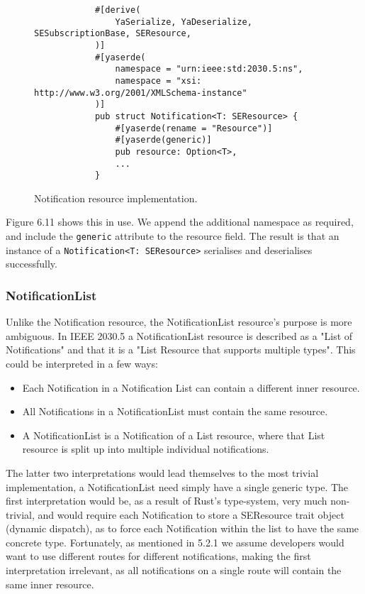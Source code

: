 \begin{figure}[H]
    \begin{center}
        \begin{lstlisting}
            #[derive(
                YaSerialize, YaDeserialize, SESubscriptionBase, SEResource,
            )]
            #[yaserde(
                namespace = "urn:ieee:std:2030.5:ns",
                namespace = "xsi: http://www.w3.org/2001/XMLSchema-instance"
            )]
            pub struct Notification<T: SEResource> {
                #[yaserde(rename = "Resource")]
                #[yaserde(generic)]
                pub resource: Option<T>,
                ...
            }    
        \end{lstlisting}
        \label{fig:notifimpl}
        \caption{Notification resource implementation.}
    \end{center}
\end{figure}

Figure 6.11 shows this in use. We append the additional namespace as required, and include the \texttt{generic} attribute to the resource field. The result is that an instance of a \texttt{Notification<T: SEResource>} serialises and deserialises successfully. 


\subsubsection{NotificationList}
Unlike the Notification resource, the NotificationList resource's purpose is more ambiguous. In IEEE 2030.5 a NotificationList resource is described as a "List of Notifications" and that it is a "List Resource that supports multiple types". This could be interpreted in a few ways:

\begin{itemize}
    \item Each Notification in a Notification List can contain a different inner resource.
    \item All Notifications in a NotificationList must contain the same resource.
    \item A NotificationList is a Notification of a List resource, where that List resource is split up into multiple individual notifications.
\end{itemize}

The latter two interpretations would lead themselves to the most trivial implementation, a NotificationList need simply have a single generic type. The first interpretation would be, as a result of Rust's type-system, very much non-trivial, and would require each Notification to store a SEResource trait object (dynamic dispatch), as to force each Notification within the list to have the same concrete type.
Fortunately, as mentioned in 5.2.1 we assume developers would want to use different routes for different notifications, making the first interpretation irrelevant, as all notifications on a single route will contain the same inner resource.

